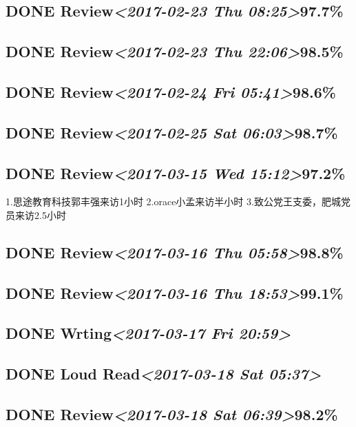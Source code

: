 \documentclass[11pt]{ctexart}
\begin{document}
\subsection{{\bfseries\sffamily DONE} Review\textit{<2017-02-23 Thu 08:25>}97.7\%}
\label{sec:org5db88ef}
\subsection{{\bfseries\sffamily DONE} Review\textit{<2017-02-23 Thu 22:06>}98.5\%}
\label{sec:orgf86f1f4}
\subsection{{\bfseries\sffamily DONE} Review\textit{<2017-02-24 Fri 05:41>}98.6\%}
\label{sec:orgf1f1291}
\subsection{{\bfseries\sffamily DONE} Review\textit{<2017-02-25 Sat 06:03>}98.7\%}
\label{sec:org7adbfc1}
\subsection{{\bfseries\sffamily DONE} Review\textit{<2017-03-15 Wed 15:12>}97.2\%}
\label{sec:org3c0020e}
1.思途教育科技郭丰强来访1小时
2.orace小孟来访半小时
3.致公党王支委，肥城党员来访2.5小时
\subsection{{\bfseries\sffamily DONE} Review\textit{<2017-03-16 Thu 05:58>}98.8\%}
\label{sec:org4b1967e}
\subsection{{\bfseries\sffamily DONE} Review\textit{<2017-03-16 Thu 18:53>}99.1\%}
\label{sec:org1ba54d0}
\subsection{{\bfseries\sffamily DONE} Wrting\textit{<2017-03-17 Fri 20:59>}}
\label{sec:orgf963e13}
\subsection{{\bfseries\sffamily DONE} Loud Read\textit{<2017-03-18 Sat 05:37>}}
\label{sec:org6ecbcf4}
\subsection{{\bfseries\sffamily DONE} Review\textit{<2017-03-18 Sat 06:39>}98.2\%}
\label{sec:org0a9cb33}
\end{document}
